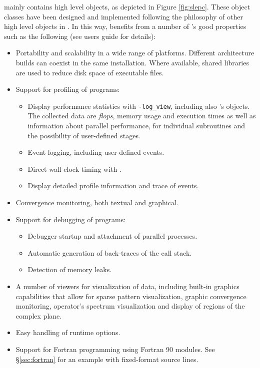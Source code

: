	\slepc mainly contains high level objects, as depicted in Figure \ref{fig:slepc}. These object classes have been designed and implemented following the philosophy of other high level objects in \petsc. In this way, \slepc benefits from a number of \petsc's good properties such as the following (see \petsc{} users guide for details):
\begin{itemize}
\item Portability and scalability in a wide range of platforms. Different architecture builds can coexist in the same installation. Where available, shared libraries are used to reduce disk space of executable files.
\item Support for profiling of programs:
  \begin{itemize}
  \setlength{\itemsep}{0mm}
  \item Display performance statistics with \Verb!-log_view!, including also \slepc's objects. The collected data are \emph{flops}, memory usage and execution times as well as information about parallel performance, for individual subroutines and the possibility of user-defined stages.
  \item Event logging, including user-defined events.
  \item Direct wall-clock timing with .
  \item Display detailed profile information and trace of events.
  \end{itemize}
\item Convergence monitoring, both textual and graphical.
\item Support for debugging of programs:
  \begin{itemize}
  \setlength{\itemsep}{0mm}
  \item Debugger startup and attachment of parallel processes.
  \item Automatic generation of back-traces of the call stack.
  \item Detection of memory leaks.
  \end{itemize}
\item A number of viewers for visualization of data, including built-in graphics capabilities that allow for sparse pattern visualization, graphic convergence monitoring, operator's spectrum visualization and display of regions of the complex plane.
\item Easy handling of runtime options.
\item Support for Fortran programming using Fortran 90 modules. See \S\ref{sec:fortran} for an example with fixed-format source lines.
\end{itemize}

